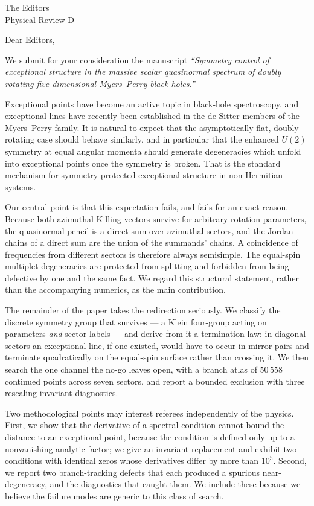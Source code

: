 \documentclass[11pt]{letter}
\begin{document}
\begin{letter}{The Editors\\ Physical Review D}
\opening{Dear Editors,}

We submit for your consideration the manuscript \emph{``Symmetry control of
exceptional structure in the massive scalar quasinormal spectrum of doubly
rotating five-dimensional Myers--Perry black holes.''}

Exceptional points have become an active topic in black-hole spectroscopy, and
exceptional lines have recently been established in the de Sitter members of the
Myers--Perry family. It is natural to expect that the asymptotically flat,
doubly rotating case should behave similarly, and in particular that the
enhanced $U(2)$ symmetry at equal angular momenta should generate degeneracies
which unfold into exceptional points once the symmetry is broken. That is the
standard mechanism for symmetry-protected exceptional structure in non-Hermitian
systems.

Our central point is that this expectation fails, and fails for an exact
reason. Because both azimuthal Killing vectors survive for arbitrary rotation
parameters, the quasinormal pencil is a direct sum over azimuthal sectors, and
the Jordan chains of a direct sum are the union of the summands' chains. A
coincidence of frequencies from different sectors is therefore always
semisimple. The equal-spin multiplet degeneracies are protected from splitting
and forbidden from being defective by one and the same fact. We regard this
structural statement, rather than the accompanying numerics, as the main
contribution.

The remainder of the paper takes the redirection seriously. We classify the
discrete symmetry group that survives --- a Klein four-group acting on
parameters \emph{and} sector labels --- and derive from it a termination law:
in diagonal sectors an exceptional line, if one existed, would have to occur in
mirror pairs and terminate quadratically on the equal-spin surface rather than
crossing it. We then search the one channel the no-go leaves open, with a branch
atlas of $50\,558$ continued points across seven sectors, and report a bounded
exclusion with three rescaling-invariant diagnostics.

Two methodological points may interest referees independently of the physics.
First, we show that the derivative of a spectral condition cannot bound the
distance to an exceptional point, because the condition is defined only up to a
nonvanishing analytic factor; we give an invariant replacement and exhibit two
conditions with identical zeros whose derivatives differ by more than $10^5$.
Second, we report two branch-tracking defects that each produced a spurious
near-degeneracy, and the diagnostics that caught them. We include these because
we believe the failure modes are generic to this class of search.


\end{letter}
\end{document}
